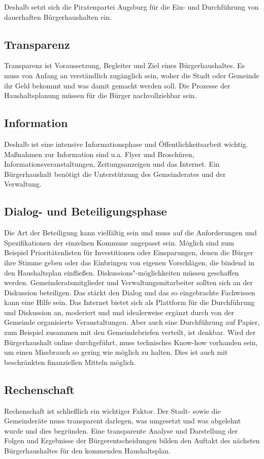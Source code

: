   Deshalb setzt sich die Piratenpartei Augsburg für die Ein- und Durchführung 
  von dauerhaften Bürgerhaushalten ein.
  
  \subsection{Transparenz}
  
  Transparenz ist Voraussetzung, Begleiter und Ziel eines Bürgerhaushaltes. Es 
  muss von Anfang an verständlich zugänglich sein, woher die Stadt oder 
  Gemeinde ihr Geld bekommt und was damit gemacht werden soll. Die Prozesse 
  der Haushaltsplanung müssen für die Bürger nachvollziehbar sein.
  
  \subsection{Information}
  
  Deshalb ist eine intensive Informationsphase und Öffentlichkeitsarbeit 
  wichtig. Maßnahmen zur Information sind u.a. Flyer und Broschüren, 
  Informationsveranstaltungen, Zeitungsanzeigen und das Internet. Ein 
  Bürgerhaushalt benötigt die Unterstützung des Gemeinderates und der 
  Verwaltung.
  
  \subsection{Dialog- und Beteiligungsphase}
  
  Die Art der Beteiligung kann vielfältig sein und muss auf die Anforderungen 
  und Spezifikationen der einzelnen Kommune angepasst sein. Möglich sind zum 
  Beispiel Prioritätenlisten für Investitionen oder Einsparungen, denen die 
  Bürger ihre Stimme geben oder das Einbringen von eigenen Vorschlägen, die 
  bindend in den Haushaltsplan einfließen. Diskussions"-möglichkeiten 
  müssen geschaffen werden. Gemeinderatsmitglieder und 
  Verwaltungsmitarbeiter sollten sich an der Diskussion beteiligen. Das 
  stärkt den Dialog und das so eingebrachte Fachwissen kann eine Hilfe sein. 
  Das Internet bietet sich als Plattform für die Durchführung und Diskussion 
  an, moderiert und und idealerweise ergänzt durch von der Gemeinde 
  organisierte Veranstaltungen. Aber auch eine Durchführung auf Papier, zum 
  Beispiel zusammen mit den Gemeindebriefen verteilt, ist denkbar. Wird der 
  Bürgerhaushalt online durchgeführt, muss technisches Know-how vorhanden 
  sein, um einen Missbrauch so gering wie möglich zu halten. Dies ist auch mit 
  beschränkten finanziellen Mitteln möglich.
  
  \subsection{Rechenschaft}
  
  Rechenschaft ist schließlich ein wichtiger Faktor. Der Stadt- sowie die 
  Gemeinderäte muss transparent darlegen, was umgesetzt und was abgelehnt 
  wurde und dies begründen. Eine transparente Analyse und Darstellung der 
  Folgen und Ergebnisse der Bürgerentscheidungen bilden den Auftakt des 
  nächsten Bürgerhaushaltes für den kommenden Haushaltsplan.